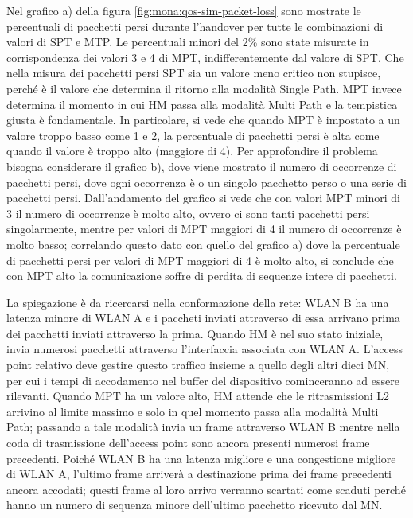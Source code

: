 \documentclass[12pt,a4paper,openright,twoside,draft]{book}
\begin{document}
Nel grafico a) della figura \ref{fig:mona:qos-sim-packet-loss} sono
mostrate le percentuali di pacchetti persi durante l'handover per
tutte le combinazioni di valori di SPT e MTP.  Le percentuali minori
del 2\% sono state misurate in corrispondenza dei valori 3 e 4 di MPT,
indifferentemente dal valore di SPT.  Che nella misura dei pacchetti
persi SPT sia un valore meno critico non stupisce, perché è il valore
che determina il ritorno alla modalità Single Path. MPT invece
determina il momento in cui HM passa alla modalità Multi Path e la
tempistica giusta è fondamentale. In particolare, si vede che quando
MPT è impostato a un valore troppo basso come 1 e 2, la percentuale di
pacchetti persi è alta come quando il valore è troppo alto (maggiore
di 4). Per approfondire il problema bisogna considerare il grafico b),
dove viene mostrato il numero di occorrenze di pacchetti persi, dove
ogni occorrenza è o un singolo pacchetto perso o una serie di
pacchetti persi. Dall'andamento del grafico si vede che con valori MPT
minori di 3 il numero di occorrenze è molto alto, ovvero ci sono
tanti pacchetti persi singolarmente, mentre per valori di MPT maggiori
di 4 il numero di occorrenze è molto basso; correlando questo dato con
quello del grafico a) dove la percentuale di pacchetti persi per
valori di MPT maggiori di 4 è molto alto, si conclude che con MPT alto
la comunicazione soffre di perdita di sequenze intere di pacchetti.

La spiegazione è da ricercarsi nella conformazione della rete: WLAN B
ha una latenza minore di WLAN A e i paccheti inviati attraverso di
essa arrivano prima dei pacchetti inviati attraverso la prima. Quando
HM è nel suo stato iniziale, invia numerosi pacchetti attraverso
l'interfaccia associata con WLAN A. L'access point relativo deve
gestire questo traffico insieme a quello degli altri dieci MN, per cui
i tempi di accodamento nel buffer del dispositivo cominceranno ad
essere rilevanti. Quando MPT ha un valore alto, HM attende che le
ritrasmissioni L2 arrivino al limite massimo e solo in quel momento
passa alla modalità Multi Path; passando a tale modalità invia un
frame attraverso WLAN B mentre nella coda di trasmissione dell'access
point sono ancora presenti numerosi frame precedenti. Poiché WLAN B ha
una latenza migliore e una congestione migliore di WLAN A, l'ultimo
frame arriverà a destinazione prima dei frame precedenti ancora
accodati; questi frame al loro arrivo verranno scartati come scaduti
perché hanno un numero di sequenza minore dell'ultimo pacchetto
ricevuto dal MN.
\end{document}

